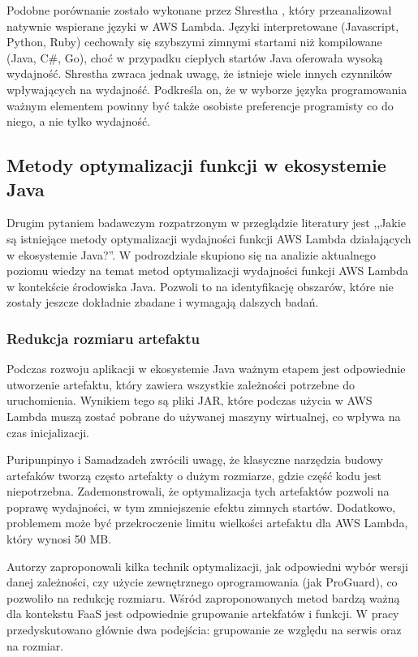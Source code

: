 Podobne porównanie zostało wykonane przez Shrestha \cite{shrestha2019lambda}, który przeanalizował natywnie wspierane języki w AWS Lambda. 
Języki interpretowane (Javascript, Python, Ruby) cechowały się szybszymi zimnymi startami niż kompilowane (Java, C\#, Go), choć w przypadku ciepłych startów Java oferowała wysoką wydajność. 
Shrestha zwraca jednak uwagę, że istnieje wiele innych czynników wpływających na wydajność. 
Podkreśla on, że w wyborze języka programowania ważnym elementem powinny być także osobiste preferencje programisty co do niego, a nie tylko wydajność.

\subsection{Metody optymalizacji funkcji w ekosystemie Java}\label{chapter:przeglad_literatury_wyniki_metody}

Drugim pytaniem badawczym rozpatrzonym w przeglądzie literatury jest ,,Jakie są istniejące metody optymalizacji wydajności funkcji AWS Lambda działających w ekosystemie Java?''.
W podrozdziale skupiono się na analizie aktualnego poziomu wiedzy na temat metod optymalizacji wydajności funkcji AWS Lambda w kontekście środowiska Java.
Pozwoli to na identyfikację obszarów, które nie zostały jeszcze dokładnie zbadane i wymagają dalszych badań.

\subsubsection*{Redukcja rozmiaru artefaktu}\label{chapter:przeglad_literatury_wyniki_redukcja_rozmiaru}

Podczas rozwoju aplikacji w ekosystemie Java ważnym etapem jest odpowiednie utworzenie artefaktu, który zawiera wszystkie zależności potrzebne do uruchomienia.
Wynikiem tego są pliki JAR, które podczas użycia w AWS Lambda muszą zostać pobrane do używanej maszyny wirtualnej, co wpływa na czas inicjalizacji.

Puripunpinyo i Samadzadeh \cite{8116416} zwrócili uwagę, że klasyczne narzędzia budowy artefaków tworzą często artefakty o dużym rozmiarze, gdzie część kodu jest niepotrzebna.
Zademonstrowali, że optymalizacja tych artefaktów pozwoli na poprawę wydajności, w tym zmniejszenie efektu zimnych startów. 
Dodatkowo, problemem może być przekroczenie limitu wielkości artefaktu dla AWS Lambda, który wynosi 50 MB.

Autorzy zaproponowali kilka technik optymalizacji, jak odpowiedni wybór wersji danej zależności, czy użycie zewnętrznego oprogramowania (jak ProGuard), co pozwoliło na redukcję rozmiaru.
Wśród zaproponowanych metod bardzą ważną dla kontekstu FaaS jest odpowiednie grupowanie artekfatów i funkcji. W pracy przedyskutowano głównie dwa podejścia: grupowanie ze względu na serwis oraz na rozmiar.

